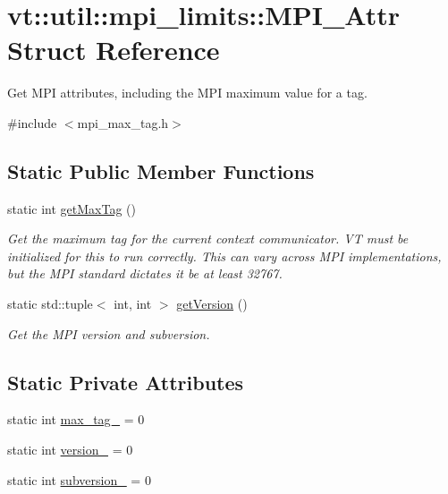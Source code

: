 \hypertarget{structvt_1_1util_1_1mpi__limits_1_1_m_p_i___attr}{}\section{vt\+:\+:util\+:\+:mpi\+\_\+limits\+:\+:M\+P\+I\+\_\+\+Attr Struct Reference}
\label{structvt_1_1util_1_1mpi__limits_1_1_m_p_i___attr}


Get M\+PI attributes, including the M\+PI maximum value for a tag.  




{\ttfamily \#include $<$mpi\+\_\+max\+\_\+tag.\+h$>$}

\subsection*{Static Public Member Functions}
\begin{DoxyCompactItemize}
\item 
static int \hyperlink{structvt_1_1util_1_1mpi__limits_1_1_m_p_i___attr_a3150f6a09a10554293f176074072ac2d}{get\+Max\+Tag} ()
\begin{DoxyCompactList}\small\item\em Get the maximum tag for the current context communicator. VT must be initialized for this to run correctly. This can vary across M\+PI implementations, but the M\+PI standard dictates it be at least 32767. \end{DoxyCompactList}\item 
static std\+::tuple$<$ int, int $>$ \hyperlink{structvt_1_1util_1_1mpi__limits_1_1_m_p_i___attr_ae56b450a99da5c631b22e8f84d5f3c25}{get\+Version} ()
\begin{DoxyCompactList}\small\item\em Get the M\+PI version and subversion. \end{DoxyCompactList}\end{DoxyCompactItemize}
\subsection*{Static Private Attributes}
\begin{DoxyCompactItemize}
\item 
static int \hyperlink{structvt_1_1util_1_1mpi__limits_1_1_m_p_i___attr_ae8f9fdb6426a31740e8a126eb0cb03fc}{max\+\_\+tag\+\_\+} = 0
\item 
static int \hyperlink{structvt_1_1util_1_1mpi__limits_1_1_m_p_i___attr_a5ac3d53035de2f0af3ac5b27bb7b91fc}{version\+\_\+} = 0
\item 
static int \hyperlink{structvt_1_1util_1_1mpi__limits_1_1_m_p_i___attr_a6f931d14868a79057cd30789622f5d58}{subversion\+\_\+} = 0
\end{DoxyCompactItemize}


